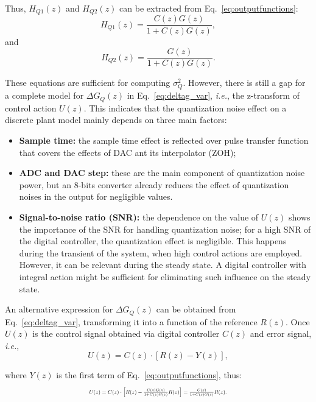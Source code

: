 \documentclass{sig-alternate-05-2015}
\begin{document}
Thus, $H_{Q1}(z)$ and $H_{Q2}(z)$ can be extracted from Eq.~\eqref{eq:outputfunctions}:
\begin{equation}
H_{Q1}(z)=\frac{C(z)G(z)}{1+C(z)G(z)},
\end{equation}
and
\begin{equation}
H_{Q2}(z)=\frac{G(z)}{1+C(z)G(z)}.
\end{equation}

These equations are sufficient for computing $\sigma_{Q}^{2}$. However, there is still a gap for a complete model for $\Delta{G_{Q}(z)}$ in Eq.~\eqref{eq:deltag_var}, {\it i.e.}, the z-transform of control action $U(z)$. This indicates that the quantization noise effect on a discrete plant model mainly depends on three main factors:
%
\begin{itemize}
\item \textbf{Sample time:} the sample time effect is reflected over pulse transfer function that covers the effects of DAC ant its interpolator (ZOH);
\item \textbf{ADC and DAC step: } these are the main component of quantization noise power, but an $8$-bits converter already reduces the effect of quantization noises in the output for negligible values.
\item \textbf{Signal-to-noise ratio (SNR): } the dependence on the value of $U(z)$ shows the importance of the SNR for handling quantization noise; for a high SNR of the digital controller, the quantization effect is negligible. This happens during the transient of the system, when high control actions are employed. However, it can be relevant during the steady state. A digital controller with integral action might be sufficient for eliminating such influence on the steady state.
\end{itemize}

An alternative expression for $\Delta{G_{Q}(z)}$ can be obtained from Eq.~\eqref{eq:deltag_var}, transforming it into a function of the reference $R(z)$. Once $U(z)$ is the control signal obtained via digital controller $C(z)$ and error signal, {\it i.e.},
%
\begin{equation}
U(z)=C(z)\cdot[R(z)-Y(z)],
\end{equation} 

\noindent where $Y(z)$ is the first term of Eq.~\eqref{eq:outputfunctions}, thus:
\begin{equation}
\label{eq:controlsignal}
\resizebox{0.48\textwidth}{!}{
$U(z)=C(z)\cdot \left[R(z)-\frac{C(z)G(z)}{1+C(z)G(z)}R(z)\right]=\frac{C(z)}{1+C(z)G(z)}R(z).$
}
\end{equation} 
\end{document}
